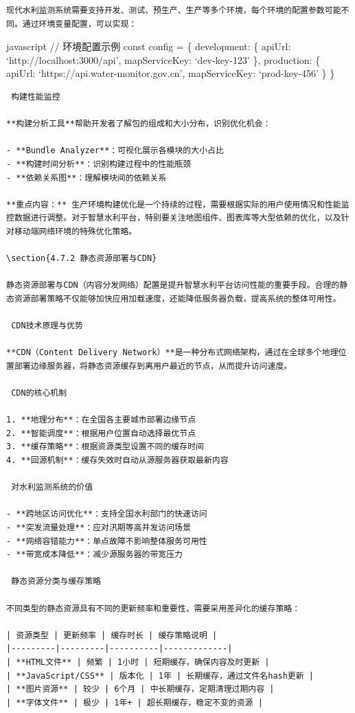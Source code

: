 {{\begin{lstlisting}
现代水利监测系统需要支持开发、测试、预生产、生产等多个环境，每个环境的配置参数可能不同。通过环境变量配置，可以实现：
\end{lstlisting}

javascript // 环境配置示例 const config = \{ development: \{ apiUrl: `http://localhost:3000/api', mapServiceKey: `dev-key-123' \}, production: \{ apiUrl: `https://api.water-monitor.gov.cn', mapServiceKey: `prod-key-456' \} \}

\begin{lstlisting}
 构建性能监控

**构建分析工具**帮助开发者了解包的组成和大小分布，识别优化机会：

- **Bundle Analyzer**：可视化展示各模块的大小占比
- **构建时间分析**：识别构建过程中的性能瓶颈
- **依赖关系图**：理解模块间的依赖关系

**重点内容：** 生产环境构建优化是一个持续的过程，需要根据实际的用户使用情况和性能监控数据进行调整。对于智慧水利平台，特别要关注地图组件、图表库等大型依赖的优化，以及针对移动端网络环境的特殊优化策略。

\section{4.7.2 静态资源部署与CDN}

静态资源部署与CDN（内容分发网络）配置是提升智慧水利平台访问性能的重要手段。合理的静态资源部署策略不仅能够加快应用加载速度，还能降低服务器负载，提高系统的整体可用性。

 CDN技术原理与优势

**CDN（Content Delivery Network）**是一种分布式网络架构，通过在全球多个地理位置部署边缘服务器，将静态资源缓存到离用户最近的节点，从而提升访问速度。

 CDN的核心机制

1. **地理分布**：在全国各主要城市部署边缘节点
2. **智能调度**：根据用户位置自动选择最优节点
3. **缓存策略**：根据资源类型设置不同的缓存时间
4. **回源机制**：缓存失效时自动从源服务器获取最新内容

 对水利监测系统的价值

- **跨地区访问优化**：支持全国水利部门的快速访问
- **突发流量处理**：应对汛期等高并发访问场景
- **网络容错能力**：单点故障不影响整体服务可用性
- **带宽成本降低**：减少源服务器的带宽压力

 静态资源分类与缓存策略

不同类型的静态资源具有不同的更新频率和重要性，需要采用差异化的缓存策略：

| 资源类型 | 更新频率 | 缓存时长 | 缓存策略说明 |
|---------|---------|----------|-------------|
| **HTML文件** | 频繁 | 1小时 | 短期缓存，确保内容及时更新 |
| **JavaScript/CSS** | 版本化 | 1年 | 长期缓存，通过文件名hash更新 |
| **图片资源** | 较少 | 6个月 | 中长期缓存，定期清理过期内容 |
| **字体文件** | 极少 | 1年+ | 超长期缓存，稳定不变的资源 |


\end{lstlisting}}}
